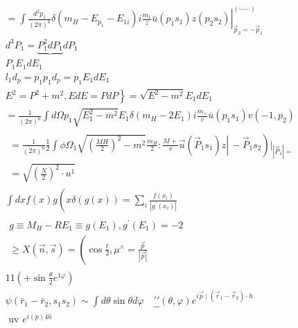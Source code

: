 \documentclass[10pt]{article}
\begin{document}
\[
\begin{aligned}
& =\left.\int \frac{d^{2} p_{1}}{(2 \pi)^{6}} \delta\left(m_{H}-E_{p_{1}}-E_{1 i}\right) i \frac{m_{1}}{z} \bar{u}\left(p_{1} s_{1}\right) z\left(p_{2} s_{2}\right)\right|_{\vec{p}_{2}=-\vec{p}_{1}} ^{(\cdots \cdots)} \\
& d^{3} P_{1}=\underbrace{P_{1}^{2} d P_{1}} d P_{1} \\
& P_{1} E_{1} d E_{1} \\
& l_{1} d_{p}=p_{1} p_{1} d_{p}=p_{1} E_{1} d E_{1} \\
& \left.E^{2}=P^{2}+m^{2}, E d E=P d P\right\}=\sqrt{E^{2}-m^{2}} E_{1} d E_{1} \\
& =\frac{1}{(2 \pi)^{6}} \int d \Omega p_{1} \sqrt{E_{1}^{2}-m^{2}} E_{1} \delta\left(m_{H}-2 E_{1}\right) i \frac{m_{+}}{v} \bar{u}\left(p_{1} s_{1}\right) v\left(-1, p_{2}\right) \\
& \begin{array}{r}
\left.=\frac{1}{(2 \pi)^{6}} \frac{1}{2} \int \phi \Omega_{1} \sqrt{\left(\frac{M H}{2}\right)^{2}-m^{2}} \frac{m_{H}}{2}: \left.\frac{M+}{v} \vec{u}\left(\vec{P}_{1} s_{1}\right) z \right\rvert\,-\vec{P}_{1} s_{2}\right)\left.\right|_{\left|\vec{P}_{1}\right|=} \\
=\sqrt{\left(\frac{N}{2}\right)^{2} \cdot u^{1}}
\end{array} \\
& \int d x f(x) g\left(x \delta(g(x))=\sum_{i} \frac{f\left(x_{i}\right)}{\left|g^{\prime}\left(x_{i}\right)\right|}\right. \\
& \begin{array}{l}
g \equiv M_{H}-R E_{1} \equiv g\left(E_{1}\right), g^{\prime}\left(E_{1}\right)=-2 \\
\geqslant X(\vec{n}, \vec{s})=\left(\cos \frac{t}{2}, \mu^{\wedge}=\frac{\vec{p}}{|\vec{p}|}\right.
\end{array} \\
& 11\left(+\sin \frac{\theta}{2} e^{1 \varphi}\right) \\
& \psi\left(\bar{r}_{1}-\bar{r}_{2}, s_{1} s_{2}\right) \sim \int d \theta \sin \theta d \varphi \quad \underbrace{\prime \prime}(\theta, \varphi) e^{i \vec{p} \mid\left(\vec{r}_{1}-\vec{r}_{2}\right) \cdot \hat{h}} \\
& \text { uv } e^{i(p) \overline{4} \hat{n}}
\end{aligned}
\]
\end{document}
